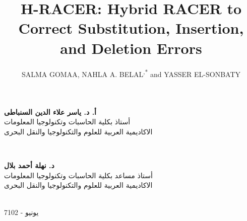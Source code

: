 \documentclass{llncs}
\begin{document}
\begin{titlepage}
\begin{minipage}{0.45\textwidth}
\begin{flushleft}
{\large \bfseries 
أ. د. ياسر علاء الدين السنباطى
}\\
{
أستاذ بكلية الحاسبات وتكنولوجيا المعلومات
}\\
{
الاكاديمية العربية للعلوم والتكنولوجيا والنقل البحرى
}
\end{flushleft}
\end{minipage}
~
\begin{minipage}{0.47\textwidth}
\begin{flushright}
\center
{\large \bfseries 
د. نهلة أحمد بلال
}\\
{
أستاذ مساعد بكلية الحاسبات وتكنولوجيا المعلومات
}\\
{
الاكاديمية العربية للعلوم والتكنولوجيا والنقل البحرى
}
\end{flushright}
\end{minipage}\\[1cm]
{
يونيو - 7102
}\\[0.2cm] 
\vfill %
\end{titlepage}



\title{H-RACER: Hybrid RACER to Correct Substitution, Insertion, and Deletion Errors}

\author{SALMA GOMAA\fnmsep{}, NAHLA A. BELAL\fnmsep{}\textsuperscript{,*} and YASSER EL-SONBATY\fnmsep{}}

\end{document}
